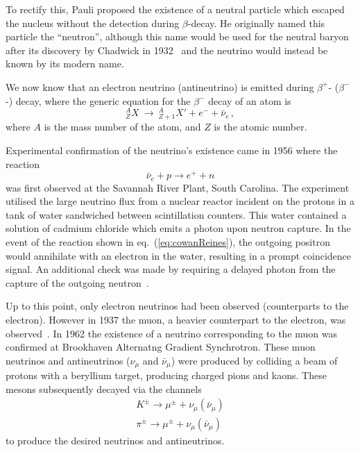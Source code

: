 To rectify this, Pauli proposed the existence of a neutral particle which escaped the nucleus without the detection during $\beta$-decay.
He originally named this particle the ``neutron'', although this name would be used for the neutral baryon after its discovery by Chadwick in 1932~\cite{neutronDiscovery} and the neutrino would instead be known by its modern name.

We now know that an electron neutrino (antineutrino) is emitted during $\beta^{+}$- ($\beta^{-}$-) decay, where the generic equation for the $\beta^{-}$ decay of an atom is
\begin{equation}
  ^{A}_{Z}X~\rightarrow~^{A}_{Z+1}X' + e^{-} + \bar{\nu}_{e} \,,
\end{equation}
where $A$ is the mass number of the atom, and $Z$ is the atomic number. 

Experimental confirmation of the neutrino's existence came in 1956 where the reaction
\begin{equation}
  \bar{\nu}_{e} + p \rightarrow e^{+} + n
  \label{eq:cowanReines}
\end{equation}
was first observed at the Savannah River Plant, South Carolina. The experiment utilised the large neutrino flux from a nuclear reactor incident on the protons in a tank of water sandwiched between scintillation counters.
This water contained a solution of cadmium chloride which emits a photon upon neutron capture.
In the event of the reaction shown in eq.~(\ref{eq:cowanReines}), the outgoing positron would annihilate with an electron in the water, resulting in a prompt coincidence signal.
An additional check was made by requiring a delayed photon from the capture of the outgoing neutron~\cite{cowanReines}.

Up to this point, only electron neutrinos had been observed (counterparts to the electron).
However in 1937 the muon, a heavier counterpart to the electron, was observed~\cite{muonDiscovery}.
In 1962 the existence of a neutrino corresponding to the muon was confirmed at Brookhaven Alternatng Gradient Synchrotron.
These muon neutrinos and antineutrinos ($\nu_{\mu}$ and $\bar{\nu}_{\mu}$) were produced by colliding a beam of protons with a beryllium target, producing charged pions and kaons.
These mesons subsequently decayed via the channels
\begin{align}
    K^{\pm} \rightarrow \mu^{\pm} + \nu_{\mu}(\bar{\nu}_{\mu}) \\
    \pi^{\pm} \rightarrow \mu^{\pm} + \nu_{\mu}(\bar{\nu}_{\mu})
\end{align}
to produce the desired neutrinos and antineutrinos.

